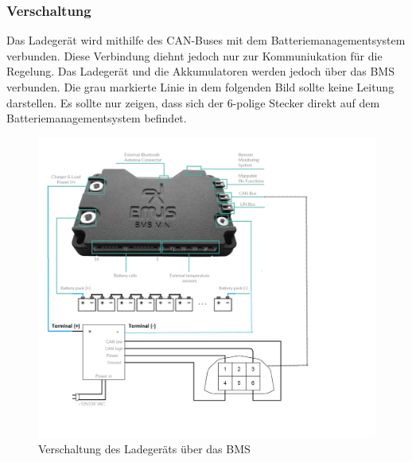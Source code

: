 \subsubsection{Verschaltung}
Das Ladegerät wird mithilfe des CAN-Buses mit dem Batteriemanagementsystem verbunden. Diese Verbindung diehnt jedoch nur zur Kommuniukation für die Regelung. Das Ladegerät und die Akkumulatoren werden jedoch über das BMS verbunden. Die grau markierte Linie in dem folgenden Bild sollte keine Leitung darstellen. Es sollte nur zeigen, dass sich der 6-polige Stecker direkt auf dem Batteriemanagementsystem befindet.

\begin{figure}[H]
	\begin{center}
		\includegraphics[scale=0.6]{figures/Akku/VerschaltungCharger.png}
		\caption{Verschaltung des Ladegeräts über das BMS \cite{LadegerätBMS}}
		\label{fig: Verschaltung des Ladegeräts über das BMS}
	\end{center}
\end{figure}


